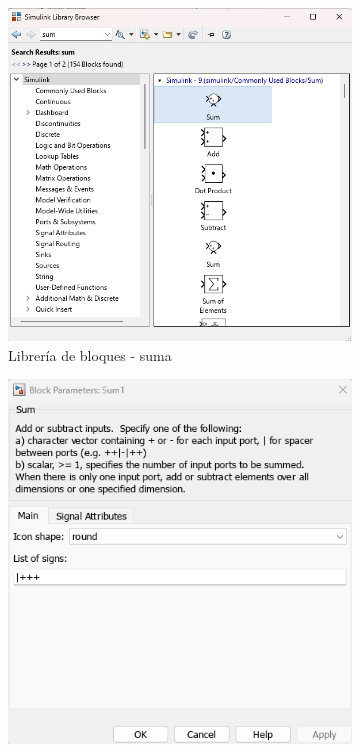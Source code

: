 \begin{figure}[htbp]
    \centering
    \begin{subfigure}[b]{0.35\textwidth}
        \centering
        \includegraphics[width=\textwidth]{fig/Capitulo5/Caso_de_estudio_PID/lib_suma.png}
        \caption{Librería de bloques - suma}
        \label{fig:lib_bloques_add}
    \end{subfigure}
    \hfill
    \begin{subfigure}[b]{0.45\textwidth}
        \centering
        \includegraphics[width=\textwidth]{fig/Capitulo5/Caso_de_estudio_PID/config_sum_01.png}

\end{subfigure}
\end{figure}
